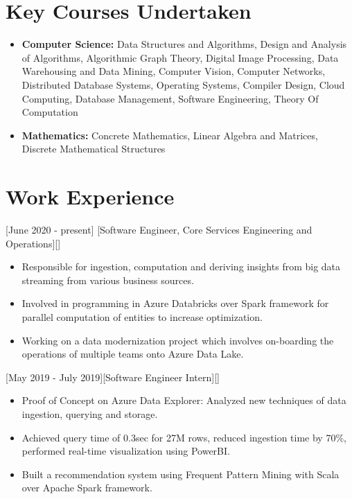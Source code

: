 \documentclass{article}
\begin{document}
\section{Key Courses Undertaken}

\begin{itemize}
\item \textbf{Computer Science:} Data Structures and Algorithms, Design and Analysis of Algorithms, Algorithmic Graph Theory, Digital Image Processing, Data Warehousing and Data Mining, Computer Vision, Computer Networks, Distributed Database Systems, Operating Systems, Compiler Design, Cloud Computing, Database Management, Software Engineering, Theory Of Computation
\item \textbf{Mathematics:} Concrete Mathematics, Linear Algebra and Matrices, Discrete Mathematical Structures
\end{itemize}

\section{Work Experience}

[June 2020 - present]
[Software Engineer, Core Services Engineering and Operations][]

\begin{itemize}
\item Responsible for ingestion, computation and deriving insights from big data streaming from various business sources.
\item Involved in programming in Azure Databricks over Spark framework for parallel computation of entities to increase optimization. 
\item Working on a data modernization project which involves on-boarding the operations of multiple teams onto Azure Data Lake.
\end{itemize}

[May 2019 - July 2019][Software Engineer Intern][]

\begin{itemize}
\item Proof of Concept on Azure Data Explorer: Analyzed new techniques of data ingestion, querying and storage. 
\item Achieved query time of 0.3sec for 27M rows, reduced ingestion time by 70\%, performed real-time visualization using PowerBI.
\item Built a recommendation system using Frequent Pattern Mining with Scala over Apache Spark framework.

\end{itemize}
\end{document}
